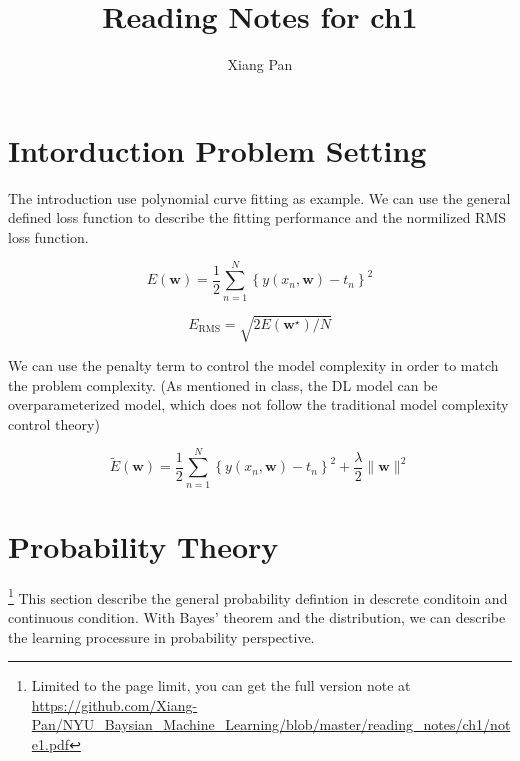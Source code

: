 \documentclass{article}
\title{Reading Notes for ch1}
\author{Xiang Pan}
\begin{document}

\section{Intorduction Problem Setting}
The introduction use polynomial curve fitting as example. We can use the general defined loss function to describe the fitting performance and the normilized RMS loss function.




$$E(\mathbf{w})=\frac{1}{2} \sum_{n=1}^{N}\left\{y\left(x_{n}, \mathbf{w}\right)-t_{n}\right\}^{2}$$

$$E_{\mathrm{RMS}}=\sqrt{2 E\left(\mathbf{w}^{\star}\right) / N}$$

We can use the penalty term to control the model complexity in order to match the problem complexity. (As mentioned in class, the DL model can be overparameterized model, which does not follow the traditional model complexity control theory)

$$\widetilde{E}(\mathbf{w})=\frac{1}{2} \sum_{n=1}^{N}\left\{y\left(x_{n}, \mathbf{w}\right)-t_{n}\right\}^{2}+\frac{\lambda}{2}\|\mathbf{w}\|^{2}$$

\section{Probability Theory} \footnote{Limited to the page limit, you can get the full version note at \url{https://github.com/Xiang-Pan/NYU_Baysian_Machine_Learning/blob/master/reading_notes/ch1/note1.pdf} }
This section describe the general probability defintion in descrete conditoin and continuous condition. With Bayes' theorem and the distribution, we can describe the learning processure in probability perspective. 
\end{document}
